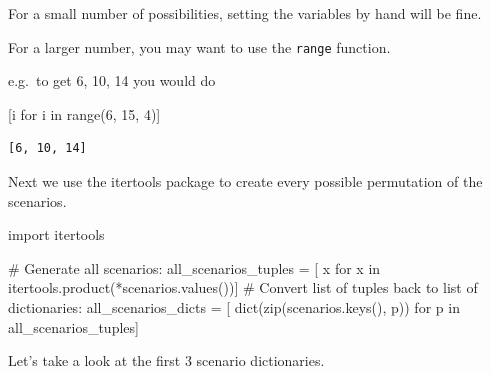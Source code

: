 \documentclass[
  letterpaper,
  DIV=11,
  numbers=noendperiod]{scrreprt}
\newenvironment{Shaded}{}{}
\newcommand{\BuiltInTok}[1]{\textcolor[rgb]{0.84,0.23,0.29}{#1}}
\newcommand{\CommentTok}[1]{\textcolor[rgb]{0.42,0.45,0.49}{#1}}
\newcommand{\ControlFlowTok}[1]{\textcolor[rgb]{0.84,0.23,0.29}{#1}}
\newcommand{\DecValTok}[1]{\textcolor[rgb]{0.00,0.36,0.77}{#1}}
\newcommand{\ImportTok}[1]{\textcolor[rgb]{0.01,0.18,0.38}{#1}}
\newcommand{\KeywordTok}[1]{\textcolor[rgb]{0.84,0.23,0.29}{#1}}
\newcommand{\NormalTok}[1]{\textcolor[rgb]{0.14,0.16,0.18}{#1}}
\newcommand{\OperatorTok}[1]{\textcolor[rgb]{0.14,0.16,0.18}{#1}}
\begin{document}
\begin{tcolorbox}[enhanced jigsaw, colframe=quarto-callout-tip-color-frame, bottomtitle=1mm, breakable, rightrule=.15mm, coltitle=black, colbacktitle=quarto-callout-tip-color!10!white, opacityback=0, leftrule=.75mm, arc=.35mm, toptitle=1mm, title=\textcolor{quarto-callout-tip-color}{\faLightbulb}\hspace{0.5em}{Tip}, titlerule=0mm, colback=white, toprule=.15mm, bottomrule=.15mm, left=2mm, opacitybacktitle=0.6]

For a small number of possibilities, setting the variables by hand will
be fine.

For a larger number, you may want to use the \texttt{range} function.

e.g.~to get 6, 10, 14 you would do

\begin{Shaded}
\begin{Highlighting}[]
\NormalTok{[i }\ControlFlowTok{for}\NormalTok{ i }\KeywordTok{in} \BuiltInTok{range}\NormalTok{(}\DecValTok{6}\NormalTok{, }\DecValTok{15}\NormalTok{, }\DecValTok{4}\NormalTok{)]}
\end{Highlighting}
\end{Shaded}

\begin{verbatim}
[6, 10, 14]
\end{verbatim}

\end{tcolorbox}

Next we use the itertools package to create every possible permutation
of the scenarios.

\begin{Shaded}
\begin{Highlighting}[]
\ImportTok{import}\NormalTok{ itertools}

\CommentTok{\# Generate all scenarios:}
\NormalTok{all\_scenarios\_tuples }\OperatorTok{=}\NormalTok{ [}
\NormalTok{    x }\ControlFlowTok{for}\NormalTok{ x }\KeywordTok{in}\NormalTok{ itertools.product(}\OperatorTok{*}\NormalTok{scenarios.values())]}
\CommentTok{\# Convert list of tuples back to list of dictionaries:}
\NormalTok{all\_scenarios\_dicts }\OperatorTok{=}\NormalTok{ [}
    \BuiltInTok{dict}\NormalTok{(}\BuiltInTok{zip}\NormalTok{(scenarios.keys(), p)) }\ControlFlowTok{for}\NormalTok{ p }\KeywordTok{in}\NormalTok{ all\_scenarios\_tuples]}
\end{Highlighting}
\end{Shaded}

Let's take a look at the first 3 scenario dictionaries.
\end{document}
